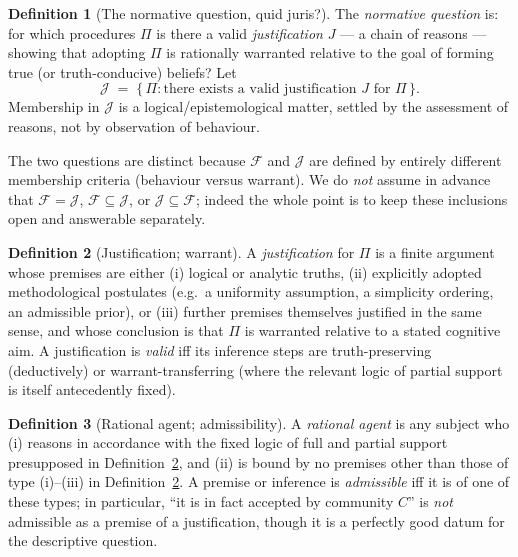 \documentclass{amsart}
\theoremstyle{definition}
\newtheorem{definition}{Definition}
\theoremstyle{plain}
\begin{document}
\begin{definition}[The normative question, quid juris?]\label{def:juris}
The \emph{normative question} is: for which procedures $\Pi$ is there a valid
\emph{justification} $J$ --- a chain of reasons --- showing that adopting $\Pi$
is rationally warranted relative to the goal of forming true (or
truth-conducive) beliefs? Let
\[
\mathcal{J} \;=\; \{\,\Pi : \text{there exists a valid justification } J
\text{ for } \Pi\,\}.
\]
Membership in $\mathcal{J}$ is a logical\slash epistemological matter, settled
by the assessment of reasons, not by observation of behaviour.
\end{definition}

The two questions are distinct because $\mathcal{F}$ and $\mathcal{J}$ are
defined by entirely different membership criteria (behaviour versus warrant).
We do \emph{not} assume in advance that $\mathcal{F} = \mathcal{J}$,
$\mathcal{F} \subseteq \mathcal{J}$, or $\mathcal{J} \subseteq \mathcal{F}$;
indeed the whole point is to keep these inclusions open and answerable
separately.

\begin{definition}[Justification; warrant]\label{def:just}
A \emph{justification} for $\Pi$ is a finite argument whose premises are either
(i) logical or analytic truths, (ii) explicitly adopted methodological
postulates (e.g.\ a uniformity assumption, a simplicity ordering, an admissible
prior), or (iii) further premises themselves justified in the same sense, and
whose conclusion is that $\Pi$ is warranted relative to a stated cognitive aim.
A justification is \emph{valid} iff its inference steps are truth-preserving
(deductively) or warrant-transferring (where the relevant logic of partial
support is itself antecedently fixed).
\end{definition}

\begin{definition}[Rational agent; admissibility]\label{def:agent}
A \emph{rational agent} is any subject who (i) reasons in accordance with the
fixed logic of full and partial support presupposed in
Definition~\ref{def:just}, and (ii) is bound by no premises other than those of
type (i)--(iii) in Definition~\ref{def:just}. A premise or inference is
\emph{admissible} iff it is of one of these types; in particular, ``it is in
fact accepted by community $C$'' is \emph{not} admissible as a premise of a
justification, though it is a perfectly good datum for the descriptive
question.
\end{definition}
\end{document}
